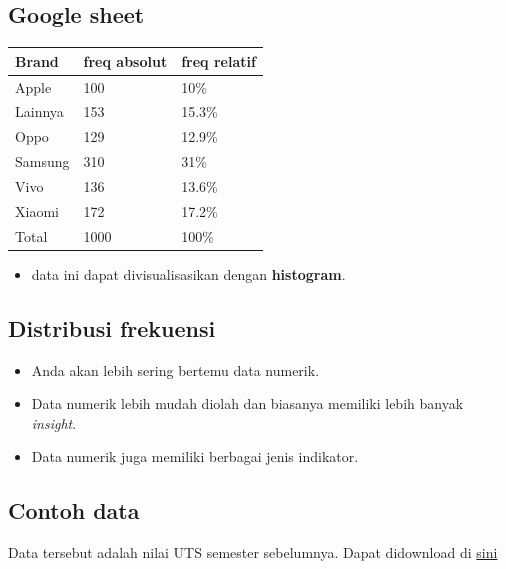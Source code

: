 \documentclass[
  letterpaper,
  DIV=11,
  numbers=noendperiod]{scrartcl}
\providecommand{\tightlist}{%
  \setlength{\itemsep}{0pt}\setlength{\parskip}{0pt}}\usepackage{longtable,booktabs,array}
\begin{document}
\hypertarget{google-sheet-1}{%
\subsection{Google sheet}\label{google-sheet-1}}

\begin{longtable}[]{@{}lll@{}}
\toprule\noalign{}
Brand & freq absolut & freq relatif \\
\midrule\noalign{}
\endhead
\bottomrule\noalign{}
\endlastfoot
Apple & 100 & 10\% \\
Lainnya & 153 & 15.3\% \\
Oppo & 129 & 12.9\% \\
Samsung & 310 & 31\% \\
Vivo & 136 & 13.6\% \\
Xiaomi & 172 & 17.2\% \\
Total & 1000 & 100\% \\
\end{longtable}

\begin{itemize}
\tightlist
\item
  data ini dapat divisualisasikan dengan \textbf{histogram}.
\end{itemize}

\hypertarget{distribusi-frekuensi-1}{%
\subsection{Distribusi frekuensi}\label{distribusi-frekuensi-1}}

\begin{itemize}
\item
  Anda akan lebih sering bertemu data numerik.
\item
  Data numerik lebih mudah diolah dan biasanya memiliki lebih banyak
  \emph{insight}.
\item
  Data numerik juga memiliki berbagai jenis indikator.
\end{itemize}

\hypertarget{contoh-data}{%
\subsection{Contoh data}\label{contoh-data}}

Data tersebut adalah nilai UTS semester sebelumnya. Dapat didownload di
\href{https://docs.google.com/spreadsheets/d/e/2PACX-1vSdLsm-5nIFgcspOncjaLwwKX1vmGbTOvhkYVOFWdHS3h15EWmHcXDSm562eyR4MiftmPJiPom7X2RM/pubhtml}{sini}
\end{document}
